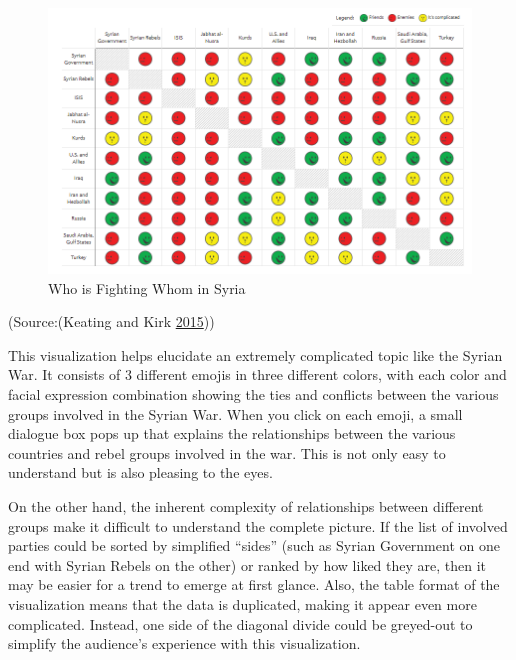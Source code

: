 \documentclass[]{book}
\begin{document}
\begin{figure}
\centering
\includegraphics{images/img_syria_summary.PNG}
\caption{Who is Fighting Whom in Syria}
\end{figure}

(Source:(Keating and Kirk \protect\hyperlink{ref-syria_chart}{2015}))

This visualization helps elucidate an extremely complicated topic like
the Syrian War. It consists of 3 different emojis in three different
colors, with each color and facial expression combination showing the
ties and conflicts between the various groups involved in the Syrian
War. When you click on each emoji, a small dialogue box pops up that
explains the relationships between the various countries and rebel
groups involved in the war. This is not only easy to understand but is
also pleasing to the eyes.

On the other hand, the inherent complexity of relationships between
different groups make it difficult to understand the complete picture.
If the list of involved parties could be sorted by simplified ``sides''
(such as Syrian Government on one end with Syrian Rebels on the other)
or ranked by how liked they are, then it may be easier for a trend to
emerge at first glance. Also, the table format of the visualization
means that the data is duplicated, making it appear even more
complicated. Instead, one side of the diagonal divide could be
greyed-out to simplify the audience's experience with this
visualization.
\end{document}
